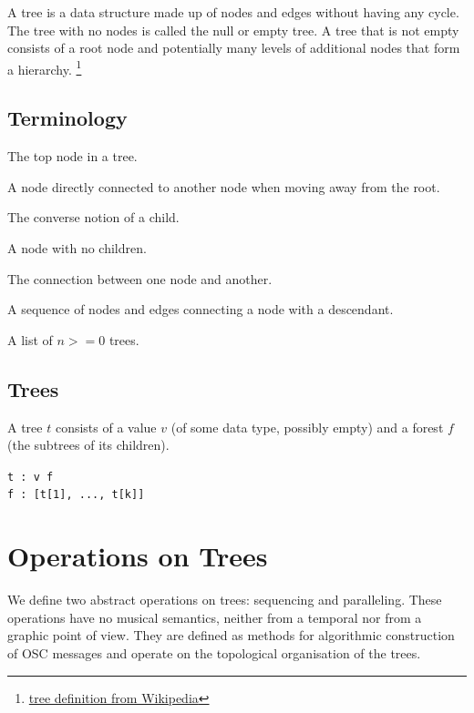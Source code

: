 \documentclass{article}
\newcommand{\code}	[2][0.9]		{\vspace{0mm}\begin{center}\colorbox{mygrey}{
							\begin{minipage}[t]{#1\columnwidth} 
							{\small \texttt{#2}}
							\end{minipage}}\end{center}}
\begin{document}
A tree is a data structure made up of nodes and edges without having any cycle. The tree with no nodes is called the null or empty tree. A tree that is not empty consists of a root node and potentially many levels of additional nodes that form a hierarchy. \footnote{\href{https://en.wikipedia.org/wiki/Tree_(data_structure)}{tree definition from Wikipedia}}


\subsection{Terminology}

\begin{description}
 \setlength\itemsep{0.0em}
\item[Root]	The top node in a tree.
\item[Child]	A node directly connected to another node when moving away from the root.
\item[Parent]	The converse notion of a child.
\item[Leaf]	A node with no children.
\item[Edge]	The connection between one node and another.
\item[Path]	A sequence of nodes and edges connecting a node with a descendant.
\item[Forest]	A list of $n >= 0$ trees.
\end{description}

\subsection{Trees}
A tree $t$ consists of a value $v$ (of some data type, possibly empty) and a forest $f$ (the subtrees of its children).
\code{t :  v f \\
f : [t[1], ..., t[k]] 
}


\section{Operations on Trees}

We define two abstract operations on trees: sequencing and paralleling. These operations have no musical semantics, neither from a temporal nor from a graphic point of view. They are defined as methods for algorithmic construction of OSC messages and operate on the topological organisation of the trees. 

\end{document}
